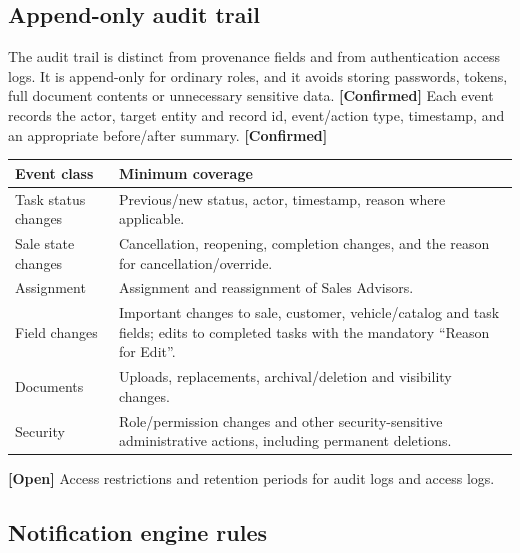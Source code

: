 \documentclass[11pt,a4paper]{article}
\newcommand{\tagconf}{\textcolor{green!45!black}{\textbf{[Confirmed]}}}
\newcommand{\tagopen}{\textcolor{red!70!black}{\textbf{[Open]}}}
\begin{document}
\subsection{Append-only audit trail}\label{sec:audit}

The audit trail is distinct from provenance fields and from authentication
access logs. It is append-only for ordinary roles, and it avoids storing
passwords, tokens, full document contents or unnecessary sensitive data.
\tagconf{} Each event records the actor, target entity and record id,
event/action type, timestamp, and an appropriate before/after summary.
\tagconf{}

\begin{longtable}{@{}L{4.4cm}L{11.4cm}@{}}
	\toprule
	\textbf{Event class} & \textbf{Minimum coverage}
	\\
	\midrule
	\endhead
	Task status changes  & Previous/new status, actor, timestamp, reason where
	applicable.
	\\
	Sale state changes   & Cancellation, reopening, completion changes, and the
	reason for cancellation/override.
	\\
	Assignment           & Assignment and reassignment of Sales Advisors.
	\\
	Field changes        & Important changes to sale, customer, vehicle/catalog
	and task fields; edits to completed tasks with the mandatory ``Reason for
	Edit''.
	\\
	Documents            & Uploads, replacements, archival/deletion and visibility
	changes.
	\\
	Security             & Role/permission changes and other security-sensitive
	administrative actions, including permanent deletions.
	\\
	\bottomrule
\end{longtable}

\tagopen{} Access restrictions and retention periods for audit logs and access
logs.

\subsection{Notification engine rules}\label{sec:notif}
\end{document}
